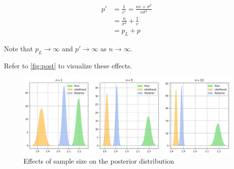 \begin{align*}
p' &= \frac{1}{v'} = \frac{n v + \sigma^2}{v \sigma^2} \\
&= \frac{n}{\sigma^2} + \frac{1}{v} \\
&= p_L + p
\end{align*}

\noindent Note that $p_L \to \infty$ and $p' \to \infty$ as $n \to \infty$.

Refer to \autoref{fig:post} to visualize these effects.

\begin{figure}[!ht]
  \centering
  \includegraphics[width=\textwidth]{images/posterior.png}
  \caption{Effects of sample size on the posterior distribution}
  \label{fig:post}
\end{figure}
